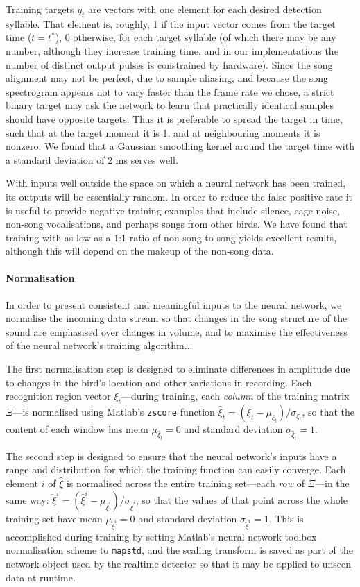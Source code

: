 \documentclass[10pt,letterpaper]{article}
\renewcommand{\subsubsection}[1]{\paragraph{#1}}
\begin{document}
Training targets $y_t$ are vectors with one element for each desired detection syllable.  That element is, roughly, 1 if the input vector comes from the
target time ($t=t^*$), 0 otherwise, for each target syllable (of which there may be any number, although they increase training time, and in our implementations the number of distinct output pulses is constrained by hardware).  Since the song
alignment may not be perfect, due to sample aliasing, and because the song spectrogram appears not to vary faster than the frame rate we chose, a strict binary target may ask the network to learn that practically identical samples should have opposite targets. Thus it is preferable to spread the target
in time, such that at the target moment it is 1,
and at neighbouring moments it is nonzero. We found that a Gaussian
smoothing kernel around the target time with a standard deviation of 2 ms serves well.

With inputs well outside the space on which a neural network has been
trained, its outputs will be essentially random. In order to reduce
the false positive rate it is useful to provide negative training
examples that include silence, cage noise, non-song vocalisations, and
perhaps songs from other birds.  We have found that training with
as low as a 1:1 ratio of non-song to song yields excellent results,
although this will depend on the makeup of the non-song data.

\subsubsection{Normalisation}

In order to present consistent and meaningful inputs to the neural network, we normalise the incoming data stream so that changes in the song structure of the sound are emphasised over changes in volume, and to maximise the effectiveness of the neural network's training algorithm...

The first normalisation step is designed to eliminate differences in amplitude due to changes in the bird's location and other variations in recording.  Each recognition region vector $\xi_t$---during training, each {\em column} of the training matrix $\Xi$---is normalised using Matlab's {\tt zscore} function $\hat{\xi}_t = (\xi_t - \mu_{\xi_t}) / \sigma_{\xi_t}$, so that the content of each window has mean $\mu_{\hat{\xi}_t}=0$ and  standard deviation $\sigma_{\hat{\xi}_t}=1$.

The second step is designed to ensure that the neural network's inputs have a range and distribution for which the training function can easily converge.  Each element $i$ of $\hat{\xi}$ is normalised across the entire training set---each {\em row} of $\Xi$---in the same way: $\check{\xi}^i = (\hat{\xi}^i - \mu_{\hat{\xi}^i})/\sigma_{\hat{\xi}^i}$, so that the values of that point across the whole training set have mean $\mu_{\check{\xi}^i}=0$ and standard deviation $\sigma_{\check{\xi}^i}=1$.  This is accomplished during training by setting Matlab's neural network toolbox normalisation scheme to {\tt mapstd}, and the scaling transform is saved as part of the network object used by the realtime detector so that it may be applied to unseen data at runtime.
\end{document}
